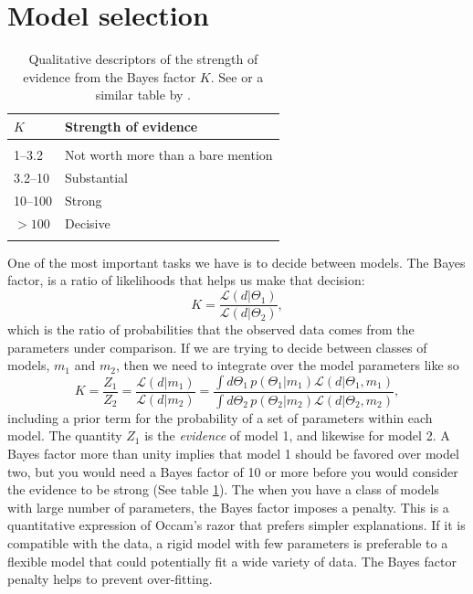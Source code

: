 \section{Model selection}

\begin{table}[t]
  \begin{center}
    \begin{tabular}{ll}
      $K$ &	\textbf{Strength of evidence} \\ \hline \\
      1--3.2 &	Not worth more than a bare mention \\
      3.2--10 &	Substantial \\
      10--100 &	Strong \\
      $> 100$ &	Decisive  \\ \\
      \hline
    \end{tabular}
  \end{center}
  \caption{Qualitative descriptors of the strength of evidence from the Bayes factor $K$. See \citet{Kass01061995} or a similar table by \citet{jeffreys1998theory}.}  \label{tab:bayes_factor}
\end{table}

One of the most important tasks we have is to decide between models.  The Bayes factor, is a ratio of likelihoods that helps us make that decision:
\begin{equation}
  K  = \frac{\mathcal{L}(d|\Theta_1)}{\mathcal{L}(d|\Theta_2)},
\end{equation}
which is the ratio of probabilities that the observed data comes from the parameters under comparison. 
If we are trying to decide between classes of models, $m_1$ and $m_2$, then we need to integrate over the model parameters like so
\begin{equation}
  K = \frac{Z_1}{Z_2} = \frac{\mathcal{L}(d|m_1)}{\mathcal{L}(d|m_2)} = \frac{\int d\Theta_1\, p(\Theta_1 | m_1)\mathcal{L}(d|\Theta_1, m_1)}{\int d\Theta_2\, p(\Theta_2 | m_2)\mathcal{L}(d|\Theta_2, m_2)},
\end{equation}
including a prior term for the probability of a set of parameters within each model.  The quantity $Z_1$ is the \textit{evidence} of model 1, and likewise for model 2.  A Bayes factor more than unity implies that model 1 should be favored over model two, but you would need a Bayes factor of 10 or more before you would consider the evidence to be strong (See table \ref{tab:bayes_factor}).  The when you have a class of models with large number of parameters, the Bayes factor imposes a penalty.  This is a quantitative expression of Occam's razor that prefers simpler explanations.  If it is compatible with the data, a rigid model with few parameters is preferable to a flexible model that could potentially fit a wide variety of data.  The Bayes factor penalty helps to prevent over-fitting.

